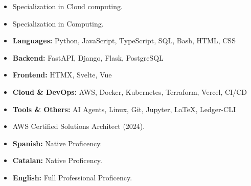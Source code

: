 

\begin{itemize}
\item Specialization in Cloud computing.
\end{itemize}


\begin{itemize}
\item Specialization in Computing.
\end{itemize}

\bigskip

\begin{itemize}
    \item \textbf{Languages:} Python, JavaScript, TypeScript, SQL, Bash, HTML, CSS
    \item \textbf{Backend:} FastAPI, Django, Flask, PostgreSQL
    \item \textbf{Frontend:} HTMX, Svelte, Vue
    \item \textbf{Cloud \& DevOps:} AWS, Docker, Kubernetes, Terraform, Vercel, CI/CD
    \item \textbf{Tools \& Others:} AI Agents, Linux, Git, Jupyter, LaTeX, Ledger-CLI
\end{itemize}

\bigskip

\begin{itemize}
\item  AWS Certified Solutions Architect (2024).
\end{itemize}

\bigskip


\begin{itemize}
    \item \textbf{Spanish:} Native Proficency.
    \item \textbf{Catalan:} Native Proficency.
    \item \textbf{English:} Full Professional Proficency.
\end{itemize}





